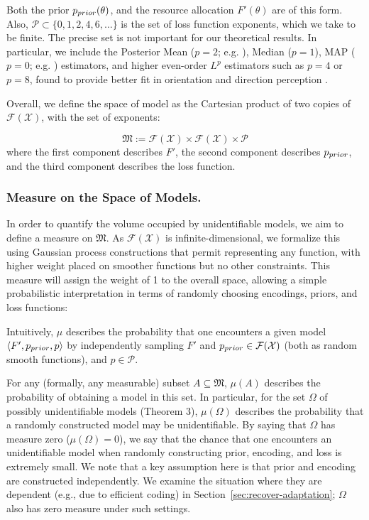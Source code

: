 Both the prior $p_{prior}(\theta)$, and the resource allocation $F'(\theta)$ are of this form. 
Also, $\mathcal{P} \subset \{0, 1, 2, 4, 6, \dots\}$ is the set of loss function exponents, which we take to be finite.
The precise set is not important for our theoretical results.
In particular, we include the Posterior Mean ($p=2$; e.g. \citep{Jazayeri2010TemporalCC}), Median ($p=1$), MAP ($p=0$; e.g. \citep{Stocker2006NoiseCA}) estimators, and higher even-order $L^p$ estimators such as $p=4$ or $p=8$, found to provide better fit in orientation and direction perception \citep{hahn2024unifying}.



Overall, we define the space of model as the Cartesian product of two copies of $\mathcal{F}(\mathcal{X})$, with the set of exponents:
\begin{defin}
\begin{equation}
    \mathfrak{M} := \mathcal{F}(\mathcal{X}) \times \mathcal{F}(\mathcal{X}) \times \mathcal{P}
\end{equation}
where the first component describes $F'$, the second component describes $p_{prior}$, and the third component describes the loss function.
\end{defin}


\subsubsection{Measure on the Space of Models.}\label{sec:measure-mu}
In order to quantify the volume occupied by unidentifiable models, we aim to define a measure on $\mathfrak{M}$. As $\mathcal{F}(\mathcal{X})$ is infinite-dimensional, we formalize this using Gaussian process constructions that permit representing any function, with higher weight placed on smoother functions but no other constraints.
This measure will assign the weight of 1 to the overall space, allowing a simple probabilistic interpretation in terms of randomly choosing encodings, priors, and loss functions:
\begin{informal_assumption}\label{ass:informal}
Intuitively, $\mu$ describes the probability that one encounters a given model $\langle F', p_{prior}, p\rangle$ by independently sampling $F'$ and $p_{prior} \in \mathcal{F}(\mathcal{X})$ (both as random smooth functions), and $p \in \mathcal{P}$.
\end{informal_assumption}
For any (formally, any measurable) subset $A \subseteq \mathfrak{M}$, $\mu(A)$ describes the probability of obtaining a model in this set. In particular, for the set $\Omega$ of possibly unidentifiable models (Theorem 3), $\mu(\Omega)$ describes the probability that a randomly constructed model may be unidentifiable.
By saying that $\Omega$ has measure zero ($\mu(\Omega) = 0$), we say that the chance that one encounters an unidentifiable model when randomly constructing prior, encoding, and loss is extremely small.
We note that a key assumption here is that prior and encoding are constructed independently.
We examine the situation where they are dependent (e.g., due to efficient coding) in Section~\ref{sec:recover-adaptation}; $\Omega$ also has zero measure under such settings.

